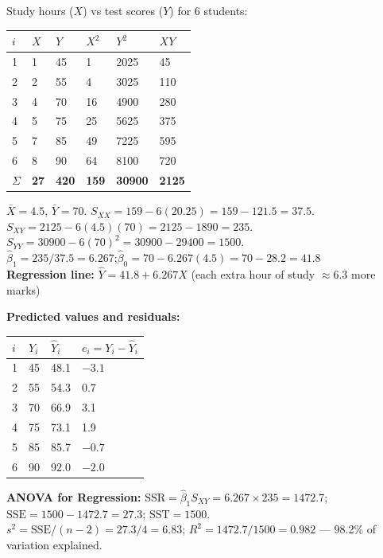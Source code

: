 \documentclass[12pt]{article}
\newcommand{\hcell}[1]{\textbf{\color{white}#1}}
\begin{document}
\newpage
\begin{examplebox}
Study hours ($X$) vs test scores ($Y$) for 6 students:
\begin{center}{\small
\begin{tabular}{|C{0.8cm}|C{1cm}|C{1cm}|C{1.5cm}|C{1.5cm}|C{1.5cm}|}
\hline{}\hcell{$i$}&\hcell{$X$}&\hcell{$Y$}&\hcell{$X^2$}&\hcell{$Y^2$}&\hcell{$XY$}\\&1&45&1&2025&45\\&2&55&4&3025&110\\&4&70&16&4900&280\\&5&75&25&5625&375\\&7&85&49&7225&595\\&8&90&64&8100&720\\\hline
{}\hcell{$\Sigma$}&\hcell{27}&\hcell{420}&\hcell{159}&\hcell{30900}&\hcell{2125}\\\hline
\end{tabular}}
\end{center}
$\bar X=4.5$,\; $\bar Y=70$. $S_{XX}=159-6(20.25)=159-121.5=37.5$. $S_{XY}=2125-6(4.5)(70)=2125-1890=235$.\\
$S_{YY}=30900-6(70)^2=30900-29400=1500$.\\[6pt]
$\hat\beta_1=235/37.5=6.267$;\quad $\hat\beta_0=70-6.267(4.5)=70-28.2=41.8$\\[4pt]
\textbf{Regression line:} $\hat Y=41.8+6.267X$ \quad (each extra hour of study $\approx6.3$ more marks)
\end{examplebox}

\begin{examplebox}
\textbf{Predicted values and residuals:}
\begin{center}{\small
\begin{tabular}{|C{0.8cm}|C{1cm}|C{1.5cm}|C{2cm}|}
\hline{}\hcell{$i$}&\hcell{$Y_i$}&\hcell{$\hat Y_i$}&\hcell{$e_i=Y_i-\hat Y_i$}\\&45&48.1&$-3.1$\\&55&54.3&0.7\\&70&66.9&3.1\\&75&73.1&1.9\\&85&85.7&$-0.7$\\&90&92.0&$-2.0$\\\hline
\end{tabular}}
\end{center}
\textbf{ANOVA for Regression:} $\text{SSR}=\hat\beta_1 S_{XY}=6.267\times235=1472.7$;\; $\text{SSE}=1500-1472.7=27.3$;\; $\text{SST}=1500$.\\
$s^2=\text{SSE}/(n-2)=27.3/4=6.83$;\; $R^2=1472.7/1500=\mathbf{0.982}$ --- 98.2\% of variation explained.
\end{examplebox}
\end{document}
